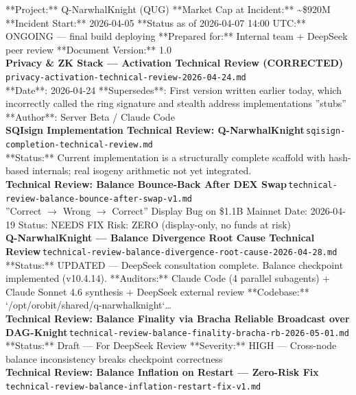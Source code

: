\documentclass[11pt,a4paper]{article}
\begin{document}
**Project:** Q-NarwhalKnight (QUG) **Market Cap at Incident:** \textasciitilde{}\$920M **Incident Start:** 2026-04-05 **Status as of 2026-04-07 14:00 UTC:** ONGOING --- final build deploying **Prepared for:** Internal team + DeepSeek peer review **Document Version:** 1.0\\[6pt]
\noindent\textbf{Privacy \& ZK Stack --- Activation Technical Review (CORRECTED)}\,\textcolor{qgray}{\small \texttt{privacy-activation-technical-review-2026-04-24.md}}\\
**Date**: 2026-04-24 **Supersedes**: First version written earlier today, which incorrectly called the ring signature and stealth address implementations ''stubs'' **Author**: Server Beta / Claude Code\\[6pt]
\noindent\textbf{SQIsign Implementation Technical Review: Q-NarwhalKnight}\,\textcolor{qgray}{\small \texttt{sqisign-completion-technical-review.md}}\\
**Status:** Current implementation is a structurally complete scaffold with hash-based internals; real isogeny arithmetic not yet integrated.\\[6pt]
\noindent\textbf{Technical Review: Balance Bounce-Back After DEX Swap}\,\textcolor{qgray}{\small \texttt{technical-review-balance-bounce-after-swap-v1.md}}\\
''Correct $\rightarrow$ Wrong $\rightarrow$ Correct'' Display Bug on \$1.1B Mainnet Date: 2026-04-19 \textbar{} Status: NEEDS FIX \textbar{} Risk: ZERO (display-only, no funds at risk)\\[6pt]
\noindent\textbf{Q-NarwhalKnight --- Balance Divergence Root Cause Technical Review}\,\textcolor{qgray}{\small \texttt{technical-review-balance-divergence-root-cause-2026-04-28.md}}\\
**Status:** UPDATED --- DeepSeek consultation complete. Balance checkpoint implemented (v10.4.14). **Auditors:** Claude Code (4 parallel subagents) + Claude Sonnet 4.6 synthesis + DeepSeek external review **Codebase:** `/opt/orobit/shared/q-narwhalknight`\ldots{}\\[6pt]
\noindent\textbf{Technical Review: Balance Finality via Bracha Reliable Broadcast over DAG-Knight}\,\textcolor{qgray}{\small \texttt{technical-review-balance-finality-bracha-rb-2026-05-01.md}}\\
**Status:** Draft --- For DeepSeek Review **Severity:** HIGH --- Cross-node balance inconsistency breaks checkpoint correctness\\[6pt]
\noindent\textbf{Technical Review: Balance Inflation on Restart --- Zero-Risk Fix}\,\textcolor{qgray}{\small \texttt{technical-review-balance-inflation-restart-fix-v1.md}}\\
\end{document}
